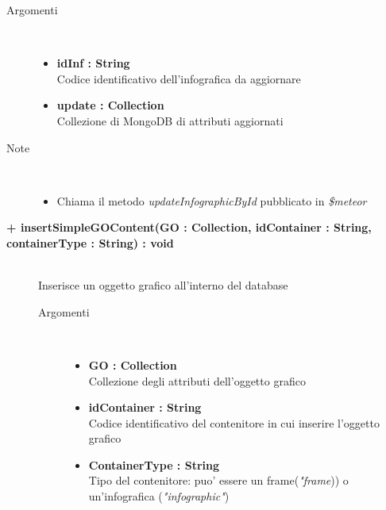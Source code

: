 \begin{description}
\begin{description}
		\begin{description}
			\item[Argomenti] \hfill \\
				\begin{itemize}
					\item \textbf{idInf : String			} \hfill \\
					Codice identificativo dell'infografica da aggiornare
					\item \textbf{update : Collection			} \hfill \\
					Collezione di MongoDB di attributi aggiornati
					
				\end{itemize}
			\item[Note] \hfill \\
			\begin{itemize}
					\item Chiama il metodo \textit{updateInfographicById} pubblicato in \textit{\$meteor}
			\end{itemize}
		\end{description}
	\end{description}
	
	\begin{description}
		\item[\textbf{\color{blue}+ insertSimpleGOContent(GO : Collection, idContainer : String, containerType : String) : void			}] \hfill \\
			Inserisce un oggetto grafico all'interno del database
			
		\begin{description}
			\item[Argomenti] \hfill \\
				\begin{itemize}
					\item \textbf{GO : Collection			} \hfill \\
					Collezione degli attributi dell'oggetto grafico
					\item \textbf{idContainer : String			} \hfill \\
					Codice identificativo del contenitore in cui inserire l'oggetto grafico
					\item \textbf{ContainerType : String			} \hfill \\
					Tipo del contenitore: puo' essere un frame(\textit{"frame})) o un'infografica (\textit{"infographic"})
					

\end{itemize}
\end{description}
\end{description}
\end{description}
